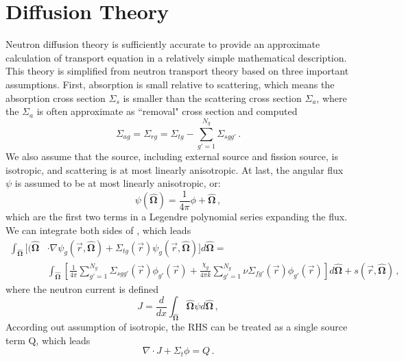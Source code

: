 \section{Diffusion Theory}
Neutron diffusion theory is sufficiently accurate to provide an approximate calculation of transport equation in a relatively simple mathematical description.
This theory is simplified from neutron transport theory based on three important assumptions\cite{stacey2018nuclear}.
First, absorption is small relative to scattering, which means the absorption cross section $\Sigma_s$ is smaller than the scattering cross section $\Sigma_a$, where the $\Sigma_a$ is often approximate as ``removal" cross section and computed 
\begin{equation}
\Sigma_{ag} = \Sigma_{rg} = \Sigma_{tg} -  \sum\limits^{N_g}_{g'=1} \Sigma_{s g g'}\, .
 \label{eq:absorption}
\end{equation}
We also assume that the source, including external source and fission source, is isotropic, and scattering is at most linearly anisotropic.
At last, the angular flux $\psi$ is assumed to be at most linearly anisotropic, or:
\begin{equation}
 \psi(\bm{\hat{\Omega}}) = \frac{1}{4\pi}\phi +\bm{\hat{\Omega}} \, ,
 \label{eq:taylor}
\end{equation}
which are the first two terms in a Legendre polynomial series expanding the flux.
We can integrate both sides of , which leads
\begin{equation}
\begin{split}
  \int_{\bm{\hat{\Omega}}} [( \bm{\hat{\Omega}} & \cdot \nabla \psi_g(\vec{r},\bm{\hat{\Omega}}) +
    \Sigma_{t g}(\vec{r}) \psi_{g}(\vec{r},\bm{\hat{\Omega}})] d\bm{\hat{\Omega}} = \\
   & \int_{\bm{\hat{\Omega}}} [\frac{1}{4\pi} \sum\limits^{N_g}_{g'=1} \Sigma_{s g g'}(\vec{r}) \phi_{g'}(\vec{r}) + \frac{\chi_g}{4\pi k} \sum\limits^{N_g}_{g'=1} \nu\Sigma_{fg'}(\vec{r}) \phi_{g'}(\vec{r})] d\bm{\hat{\Omega}} + s(\vec{r},\bm{\hat{\Omega}}) \, ,
\end{split}
 \label{eq:intg_transport}
\end{equation}
where the neutron current is defined
\begin{equation}
 J = \frac{d}{dx} \int_{\bm{\hat{\Omega}}} \bm{\hat{\Omega}} \psi d \bm{\hat{\Omega}} \, ,
 \label{eq:current}
\end{equation}
According out assumption of isotropic, the RHS can be treated as a single source term Q, which leads
\begin{equation}
 \nabla \cdot J + \Sigma_t \phi = Q \, .
 \label{eq:diffusion_ez}
\end{equation}
